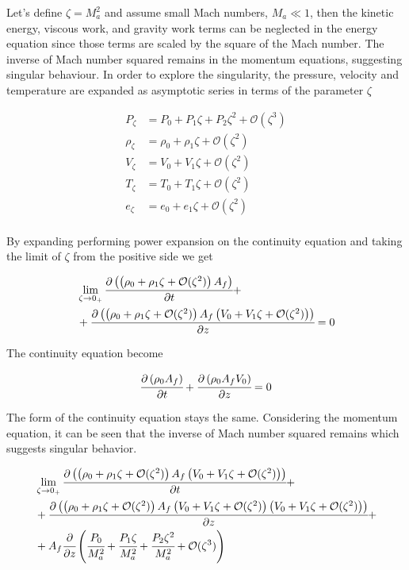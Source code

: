 \documentclass[../Parameter_fitting.tex]{subfiles}
\begin{document}
	Let's define $\zeta=M_a^2$ and assume small Mach numbers, $M_a \ll 1$, then the kinetic energy, viscous work, and gravity work terms can be neglected in the energy equation since those terms are scaled by the square of the Mach number. The inverse of Mach number squared remains in the momentum equations, suggesting singular behaviour. In order to explore the singularity, the pressure, velocity and temperature are expanded as asymptotic series in terms of the parameter $\zeta$
	
	{\footnotesize
		\begin{align*}
			P_\zeta 	& = P_0 	+ P_1 \zeta		+ P_2 \zeta^2 		+ \mathcal{O}(\zeta^3) \\
			\rho_\zeta 	& = \rho_0	+ \rho_1 \zeta	+ \mathcal{O}(\zeta^2) \\
			V_\zeta 	& = V_0		+ V_1 \zeta 	+ \mathcal{O}(\zeta^2) \\
			T_\zeta 	& = T_0 	+ T_1 \zeta 	+ \mathcal{O}(\zeta^2) \\
			e_\zeta 	& = e_0 	+ e_1 \zeta 	+ \mathcal{O}(\zeta^2) \\
		\end{align*}
	}

	 By expanding performing power expansion on the continuity equation and taking the limit of $\zeta$ from the positive side we get
	 
	 {\footnotesize
	 	\begin{align*}
	 		& \lim_{\zeta \rightarrow 0_+} \cfrac{\partial \left( \left( \rho_0	+ \rho_1 \zeta	+ \mathcal{O}(\zeta^2) \right) A_f \right)}{\partial t} + \\
	 		&+ \cfrac{\partial \left(  \left(  \rho_0 + \rho_1 \zeta + \mathcal{O}(\zeta^2) \right) A_f \left( V_0	+V_1 \zeta 	+ \mathcal{O}(\zeta^2) \right) \right) }{\partial z} = 0
	 	\end{align*}
	 }
 
	The continuity equation become
	
		 {\footnotesize
		\begin{equation}
			\cfrac{\partial \left( \rho_0 A_f \right)}{\partial t} + \cfrac{\partial \left( \rho_0 A_f V_0 \right)}{\partial z} = 0
		\end{equation}
	}

	The form of the continuity equation stays the same. Considering the momentum equation, it can be seen that the inverse of Mach number squared remains which suggests singular behavior. 
	
	{\footnotesize
		\begin{align*}
		 & \lim_{\zeta \rightarrow 0_+} \cfrac{\partial \left(  \left(  \rho_0 + \rho_1 \zeta + \mathcal{O}(\zeta^2) \right) A_f \left( V_0	+V_1 \zeta 	+ \mathcal{O}(\zeta^2) \right) \right) }{\partial t} + \\
		 &+ \cfrac{\partial \left(  \left(  \rho_0	+ \rho_1 \zeta	+ \mathcal{O}(\zeta^2) \right) A_f \left( V_0	+ V_1 \zeta 	+ \mathcal{O}(\zeta^2) \right) \left( V_0	+ V_1 \zeta + \mathcal{O}(\zeta^2) \right) \right) }{\partial z} + \\
		 &+ A_f \cfrac{\partial }{\partial z} \left(  \cfrac{P_0}{M_a^2}	+ \cfrac{P_1 \zeta}{M_a^2}	+ \cfrac{P_2 \zeta^2}{M_a^2} + \mathcal{O}(\zeta^3) \right)
		\end{align*}
	}
\end{document}
